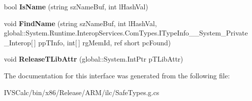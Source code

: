 \begin{DoxyCompactItemize}
\item 
\mbox{\label{interface_system_1_1_runtime_1_1_interop_services_1_1_com_types_1_1_i_type_lib_____system___private___interop_a3dbf23af652bedf5fa2f224e41e467d9}} 
bool {\bfseries Is\+Name} (string sz\+Name\+Buf, int l\+Hash\+Val)
\item 
\mbox{\label{interface_system_1_1_runtime_1_1_interop_services_1_1_com_types_1_1_i_type_lib_____system___private___interop_a8b02e80b39806b510da13271024c7b50}} 
void {\bfseries Find\+Name} (string sz\+Name\+Buf, int l\+Hash\+Val, global\+::\+System.\+Runtime.\+Interop\+Services.\+Com\+Types.\+I\+Type\+Info\+\_\+\+\_\+\+System\+\_\+\+Private\+\_\+\+Interop\mbox{[}$\,$\mbox{]} pp\+T\+Info, int\mbox{[}$\,$\mbox{]} rg\+Mem\+Id, ref short pc\+Found)
\item 
\mbox{\label{interface_system_1_1_runtime_1_1_interop_services_1_1_com_types_1_1_i_type_lib_____system___private___interop_a35bcf4ef9e11f232d8be78df4d98603f}} 
void {\bfseries Release\+T\+Lib\+Attr} (global\+::\+System.\+Int\+Ptr p\+T\+Lib\+Attr)
\end{DoxyCompactItemize}


The documentation for this interface was generated from the following file\+:\begin{DoxyCompactItemize}
\item 
I\+V\+S\+Calc/bin/x86/\+Release/\+A\+R\+M/ilc/Safe\+Types.\+g.\+cs\end{DoxyCompactItemize}
